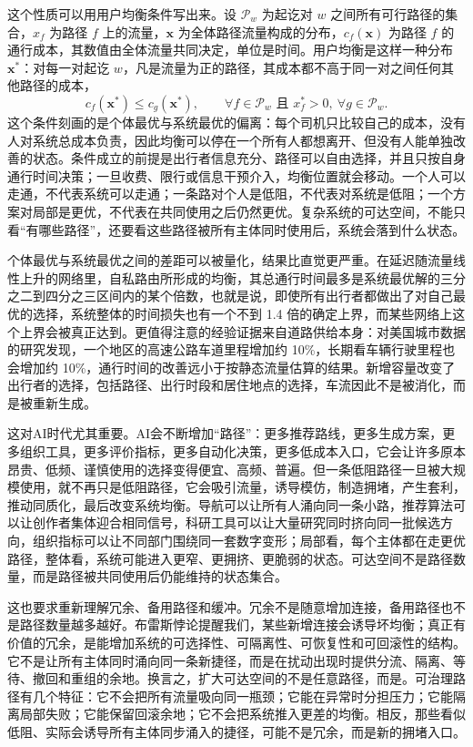 这个性质可以用用户均衡条件写出来。设 $\mathcal{P}_w$ 为起讫对 $w$ 之间所有可行路径的集合，$x_f$ 为路径 $f$ 上的流量，$\mathbf{x}$ 为全体路径流量构成的分布，$c_f(\mathbf{x})$ 为路径 $f$ 的通行成本，其数值由全体流量共同决定，单位是时间。用户均衡是这样一种分布 $\mathbf{x}^{*}$：对每一对起讫 $w$，凡是流量为正的路径，其成本都不高于同一对之间任何其他路径的成本，
\begin{equation}
c_f(\mathbf{x}^{*}) \le c_g(\mathbf{x}^{*}),
\qquad \forall f\in\mathcal{P}_w \text{ 且 } x_f^{*}>0,\ \forall g\in\mathcal{P}_w .
\end{equation}
这个条件刻画的是个体最优与系统最优的偏离：每个司机只比较自己的成本，没有人对系统总成本负责，因此均衡可以停在一个所有人都想离开、但没有人能单独改善的状态。条件成立的前提是出行者信息充分、路径可以自由选择，并且只按自身通行时间决策；一旦收费、限行或信息干预介入，均衡位置就会移动。一个人可以走通，不代表系统可以走通；一条路对个人是低阻，不代表对系统是低阻；一个方案对局部是更优，不代表在共同使用之后仍然更优。复杂系统的可达空间，不能只看“有哪些路径”，还要看这些路径被所有主体同时使用后，系统会落到什么状态\cite{wardrop1952some}。

个体最优与系统最优之间的差距可以被量化，结果比直觉更严重。在延迟随流量线性上升的网络里，自私路由所形成的均衡，其总通行时间最多是系统最优解的三分之二到四分之三区间内的某个倍数，也就是说，即使所有出行者都做出了对自己最优的选择，系统整体的时间损失也有一个不到 1.4 倍的确定上界，而某些网络上这个上界会被真正达到\cite{roughgarden2002how}。更值得注意的经验证据来自道路供给本身：对美国城市数据的研究发现，一个地区的高速公路车道里程增加约 10\%，长期看车辆行驶里程也会增加约 10\%，通行时间的改善远小于按静态流量估算的结果\cite{duranton2011fundamental}。新增容量改变了出行者的选择，包括路径、出行时段和居住地点的选择，车流因此不是被消化，而是被重新生成。


这对AI时代尤其重要。AI会不断增加“路径”：更多推荐路线，更多生成方案，更多组织工具，更多评价指标，更多自动化决策，更多低成本入口，它会让许多原本昂贵、低频、谨慎使用的选择变得便宜、高频、普遍。但一条低阻路径一旦被大规模使用，就不再只是低阻路径，它会吸引流量，诱导模仿，制造拥堵，产生套利，推动同质化，最后改变系统均衡。导航可以让所有人涌向同一条小路，推荐算法可以让创作者集体迎合相同信号，科研工具可以让大量研究同时挤向同一批候选方向，组织指标可以让不同部门围绕同一套数字变形；局部看，每个主体都在走更优路径，整体看，系统可能进入更窄、更拥挤、更脆弱的状态。可达空间不是路径数量，而是路径被共同使用后仍能维持的状态集合。

这也要求重新理解冗余、备用路径和缓冲。冗余不是随意增加连接，备用路径也不是路径数量越多越好。布雷斯悖论提醒我们，某些新增连接会诱导坏均衡；真正有价值的冗余，是能增加系统的可选择性、可隔离性、可恢复性和可回滚性的结构。它不是让所有主体同时涌向同一条新捷径，而是在扰动出现时提供分流、隔离、等待、撤回和重组的余地。换言之，扩大可达空间的不是任意路径，而是。可治理路径有几个特征：它不会把所有流量吸向同一瓶颈；它能在异常时分担压力；它能隔离局部失败；它能保留回滚余地；它不会把系统推入更差的均衡。相反，那些看似低阻、实际会诱导所有主体同步涌入的捷径，可能不是冗余，而是新的拥堵入口。

